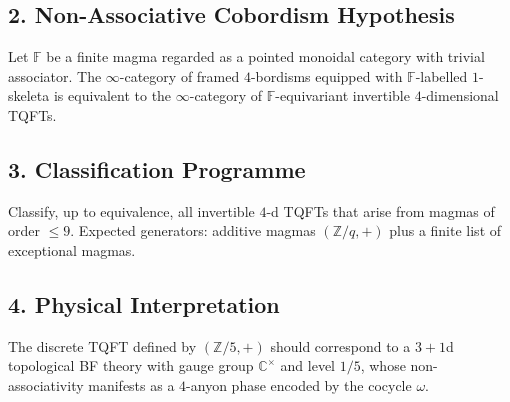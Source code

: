 \documentclass[11pt]{article}
\begin{document}
\subsection*{2.  Non-Associative Cobordism Hypothesis}
\begin{conjecture}
Let $\mathbb F$ be a finite magma regarded as a pointed monoidal category with trivial associator.
The $\infty$-category of framed $4$-bordisms equipped with $\mathbb F$-labelled $1$-skeleta is equivalent to the $\infty$-category of $\mathbb F$-equivariant invertible $4$-dimensional TQFTs.
\end{conjecture}

\subsection*{3.  Classification Programme}
Classify, up to equivalence, all invertible $4$-d TQFTs that arise from magmas of order $\le 9$.
Expected generators: additive magmas $(\mathbb{Z}/q,+)$ plus a finite list of exceptional magmas.

\subsection*{4.  Physical Interpretation}
The discrete TQFT defined by $(\mathbb{Z}/5,+)$ should correspond to a $3{+}1$d topological BF theory with gauge group $\mathbb{C}^\times$ and level $1/5$, whose non-associativity manifests as a $4$-anyon phase encoded by the cocycle $\omega$.
\end{document}
